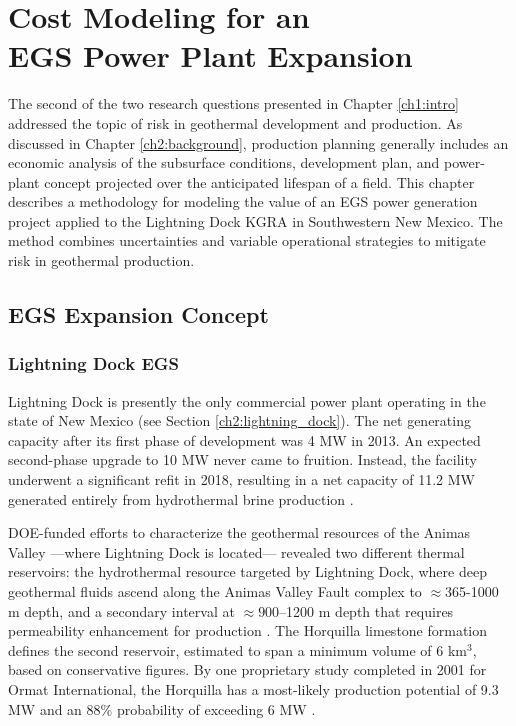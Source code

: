 \chapter{Cost Modeling for an\\EGS Power Plant Expansion}\label{ch4:cm_prep}

The second of the two research questions presented in Chapter \ref{ch1:intro} addressed the topic of risk in geothermal development and production. As discussed in Chapter \ref{ch2:background}, production planning generally includes an economic analysis of the subsurface conditions, development plan, and power-plant concept projected over the anticipated lifespan of a field. This chapter describes a methodology for modeling the value of an EGS power generation project applied to the Lightning Dock KGRA in Southwestern New Mexico. The method combines uncertainties and variable operational strategies to mitigate risk in geothermal production.

\section{EGS Expansion Concept}\label{ch4:cm_concept}

\subsection{Lightning Dock EGS}\label{ch4:lightning_dock_egs}

Lightning Dock is presently the only commercial power plant operating in the state of New Mexico (see Section \ref{ch2:lightning_dock}). The net generating capacity after its first phase of development was 4 MW in 2013. An expected second-phase upgrade to 10 MW never came to fruition. Instead, the facility underwent a significant refit in 2018, resulting in a net capacity of 11.2 MW generated entirely from hydrothermal brine production \citep{bonafin_repowering_2019}.

DOE-funded efforts to characterize the geothermal resources of the Animas Valley ---where Lightning Dock is located--- revealed two different thermal reservoirs: the hydrothermal resource targeted by Lightning Dock, where deep geothermal fluids ascend along the Animas Valley Fault complex to $\approx$365-1000 m depth, and a secondary interval at $\approx900$--1200 m depth that requires permeability enhancement for production \citep{schochet_development_2001}. The Horquilla limestone formation defines the second reservoir, estimated to span a minimum volume of 6 km$^3$, based on conservative figures. By one proprietary study completed in 2001 for Ormat International, the Horquilla has a most-likely production potential of 9.3 MW and an 88\% probability of exceeding 6 MW \citep{schochet_development_2001}.

